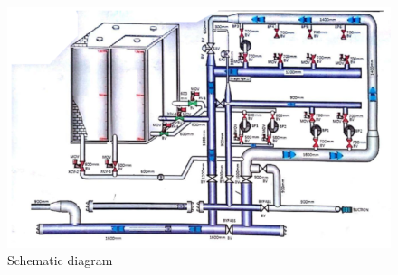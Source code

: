 \begin{figure}[h]
	\includegraphics[scale=2.1]{figures/ch04_schematicdiagram} 
	\caption{Schematic diagram}
	\label{ch01_keyplan}
\end{figure}


